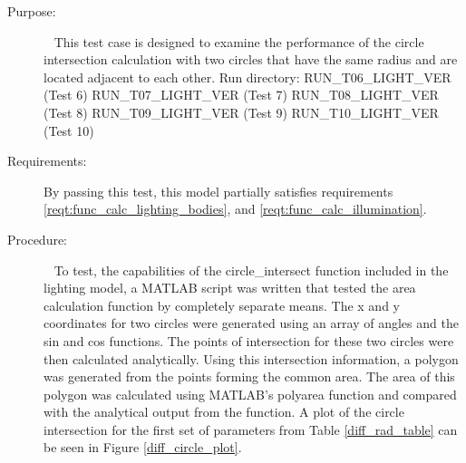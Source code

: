 \label{test:diff_cir}
\begin{description}
\item[Purpose:] \ \newline
This test case is designed to examine the performance of the circle
intersection calculation with two circles that have the same radius and
are located adjacent to each other.
\newline
Run directory: RUN\_T06\_LIGHT\_VER (Test 6) \newline
               RUN\_T07\_LIGHT\_VER (Test 7) \newline
               RUN\_T08\_LIGHT\_VER (Test 8) \newline
               RUN\_T09\_LIGHT\_VER (Test 9) \newline
               RUN\_T10\_LIGHT\_VER (Test 10) \newline
\item[Requirements:]%
By passing this test, this model partially satisfies requirements
\mbox{\ref{reqt:func_calc_lighting_bodies}}, and
\mbox{\ref{reqt:func_calc_illumination}}.

\item[Procedure:]\ \newline
To test, the capabilities of the circle\_intersect function included in the
lighting model, a MATLAB script was written that tested the area
calculation function by completely separate means.  The x and y coordinates
for two circles were generated using an array of angles and the sin and cos
functions.  The points of intersection for these two circles were then
calculated analytically.  Using this intersection information, a polygon was
generated from the points forming the common area.  The area of this polygon
was calculated using MATLAB's polyarea function and compared with the
analytical output from the function.  A plot of the circle intersection for
the first set of parameters from Table \ref{diff_rad_table} can be seen in
Figure \ref{diff_circle_plot}.


\end{description}
